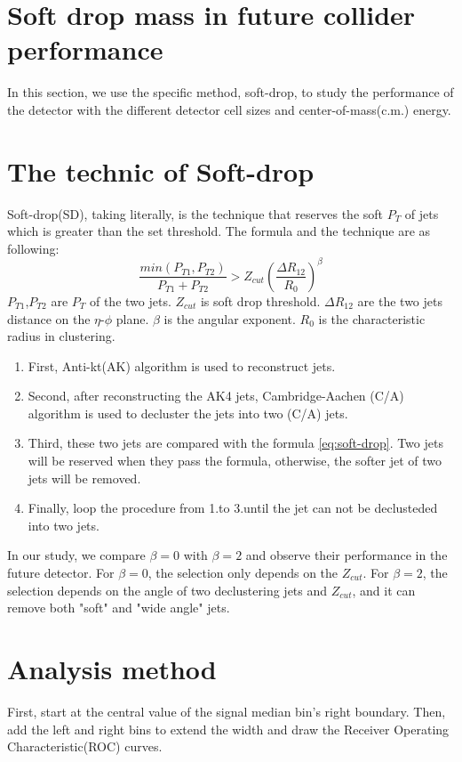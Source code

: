 \documentclass[final,1p,11pt]{elsarticle}
\begin{document}
\section{Soft drop mass in future collider performance}
In this section, we use the specific method, soft-drop, to study the performance of the detector with the different detector cell sizes and center-of-mass(c.m.) energy. 
\section{The technic of Soft-drop}
Soft-drop(SD), taking literally, is the technique that reserves the soft $P_{T}$ of jets which is greater than the set threshold. The formula and the technique are as following:
\begin{equation} \label{eq:soft-drop}
\frac{min(P_{T1},P_{T2})}{P_{T1}+P_{T2}}>Z_{cut}(\frac{\Delta R_{12}}{R_{0}})^{\beta}
\end{equation}
$P_{T1}$,$P_{T2}$ are $P_{T}$ of the two jets. $Z_{cut}$ is soft drop threshold. $\Delta R_{12}$ are the two jets distance on the $\eta$-$\phi$ plane. $\beta$ is the angular exponent. $R_{0}$ is the characteristic radius in clustering.
\begin{enumerate}
\item First, Anti-kt(AK) algorithm is used to reconstruct jets.
\item Second, after reconstructing the AK4 jets, Cambridge-Aachen (C/A) algorithm is used to decluster the jets into two (C/A) jets.
\item Third, these two jets are compared with the formula \ref{eq:soft-drop}. Two jets will be reserved when they pass the formula, otherwise, the softer jet of two jets will be removed.
\item Finally, loop the procedure from 1.to 3.until the jet can not be declusteded into two jets.
\end{enumerate}
In our study, we compare $\beta=0$ with $\beta=2$ and observe their performance in the future detector. For $\beta=0$, the selection only depends on the $Z_{cut}$. For $\beta=2$, the selection depends on the angle of two declustering jets and $Z_{cut}$, and it can remove both "soft" and "wide angle" jets.   
\section{Analysis method}
First, start at the central value of the signal median bin's right boundary. Then, add the left and right bins to extend the width and draw the Receiver Operating Characteristic(ROC) curves.
\end{document}
